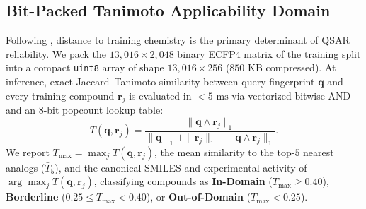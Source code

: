 \documentclass[10pt,twocolumn,letterpaper]{article}
\newcommand{\Tmax}{T_{\max}}
\begin{document}
\subsection{Bit-Packed Tanimoto Applicability Domain}
Following \citet{sheridan2004similarity}, distance to training chemistry is the primary determinant of \textsc{QSAR} reliability. We pack the $13{,}016 \times 2{,}048$ binary \textsc{ECFP4} matrix of the training split into a compact \texttt{uint8} array of shape $13{,}016 \times 256$ ($850\text{ KB}$ compressed). At inference, exact Jaccard–Tanimoto similarity between query fingerprint $\mathbf{q}$ and every training compound $\mathbf{r}_j$ is evaluated in $<5\text{ ms}$ via vectorized bitwise \textsc{AND} and an 8-bit popcount lookup table:
\begin{equation}
  T(\mathbf{q}, \mathbf{r}_j) = \frac{\|\mathbf{q} \wedge \mathbf{r}_j\|_1}{\|\mathbf{q}\|_1 + \|\mathbf{r}_j\|_1 - \|\mathbf{q} \wedge \mathbf{r}_j\|_1}.
\end{equation}
We report $\Tmax = \max_j T(\mathbf{q}, \mathbf{r}_j)$, the mean similarity to the top-$5$ nearest analogs ($\bar{T}_5$), and the canonical \textsc{SMILES} and experimental activity of $\arg\max_j T(\mathbf{q}, \mathbf{r}_j)$, classifying compounds as \textbf{In-Domain} ($\Tmax \ge 0.40$), \textbf{Borderline} ($0.25 \le \Tmax < 0.40$), or \textbf{Out-of-Domain} ($\Tmax < 0.25$).

\end{document}
